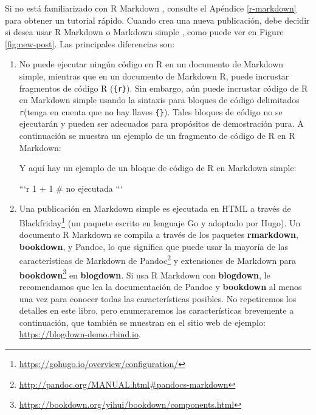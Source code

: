 \documentclass[12pt,]{krantz}
\makeatletter
\newenvironment{Shaded}{\begin{snugshade}}{\end{snugshade}}
\newcommand{\NormalTok}[1]{#1}
\renewcommand{\href}[2]{#2\footnote{\url{#1}}}
\newenvironment{kframe}{%
\medskip{}
\setlength{\fboxsep}{.8em}
 \def\at@end@of@kframe{}%
 \ifinner\ifhmode%
  \def\at@end@of@kframe{\end{minipage}}%
  \begin{minipage}{\columnwidth}%
 \fi\fi%
 \def\FrameCommand##1{\hskip\@totalleftmargin \hskip-\fboxsep
 \colorbox{shadecolor}{##1}\hskip-\fboxsep
     \hskip-\linewidth \hskip-\@totalleftmargin \hskip\columnwidth}%
 \MakeFramed {\advance\hsize-\width
   \@totalleftmargin\z@ \linewidth\hsize
   \@setminipage}}%
 {\par\unskip\endMakeFramed%
 \at@end@of@kframe}
\renewenvironment{Shaded}{\begin{kframe}}{\end{kframe}}
\theoremstyle{definition}
\theoremstyle{definition}
\theoremstyle{definition}
\theoremstyle{remark}
\makeatother
\begin{document}
Si no está familiarizado con R Markdown , consulte el
Apéndice \ref{r-markdown} para obtener un tutorial rápido. Cuando crea
una nueva publicación, debe decidir si desea usar R Markdown o Markdown
simple , como puede ver en Figure \ref{fig:new-post}.
Las principales diferencias son:

\begin{enumerate}
\def\labelenumi{\arabic{enumi}.}
\item
  No puede ejecutar ningún código en R en un documento de Markdown
  simple, mientras que en un documento de Markdown R, puede incrustar
  fragmentos de código R
  (\texttt{\textasciigrave{}\textasciigrave{}\textasciigrave{}\{r\}}).
  Sin embargo, aún puede incrustar código de R en Markdown simple usando
  la sintaxis para bloques de código delimitados
  \texttt{\textasciigrave{}\textasciigrave{}\textasciigrave{}r}(tenga en
  cuenta que no hay llaves \texttt{\{\}}). Tales bloques de código no se
  ejecutarán y pueden ser adecuados para propósitos de demostración
  pura. A continuación se muestra un ejemplo de un fragmento de código
  de R en R Markdown:

\begin{Shaded}
\end{Shaded}

  Y aquí hay un ejemplo de un bloque de código de R en Markdown simple:

\begin{Shaded}
\begin{Highlighting}[]
\NormalTok{```r}
\NormalTok{1 + 1  # no ejecutada}
\NormalTok{```}
\end{Highlighting}
\end{Shaded}
\item
  Una publicación en Markdown simple es ejecutada en HTML a través de
  \href{https://gohugo.io/overview/configuration/}{Blackfriday}
  (un paquete escrito en lenguaje Go y adoptado por
  Hugo). Un documento R Markdown se compila a través de los paquetes
  \textbf{rmarkdown}, \textbf{bookdown}, y Pandoc, lo que
  significa que puede usar la mayoría de las características de
  \href{http://pandoc.org/MANUAL.html\#pandocs-markdown}{Markdown de
  Pandoc} y
  \href{https://bookdown.org/yihui/bookdown/components.html}{extensiones
  de Markdown para \textbf{bookdown}} en \textbf{blogdown}. Si usa R
  Markdown \citep{R-rmarkdown} con \textbf{blogdown}, le recomendamos
  que lea la documentación de Pandoc y \textbf{bookdown} al menos una
  vez para conocer todas las características posibles. No repetiremos
  los detalles en este libro, pero enumeraremos las características
  brevemente a continuación, que también se muestran en el sitio web de
  ejemplo: \url{https://blogdown-demo.rbind.io}.


\end{enumerate}
\end{document}

